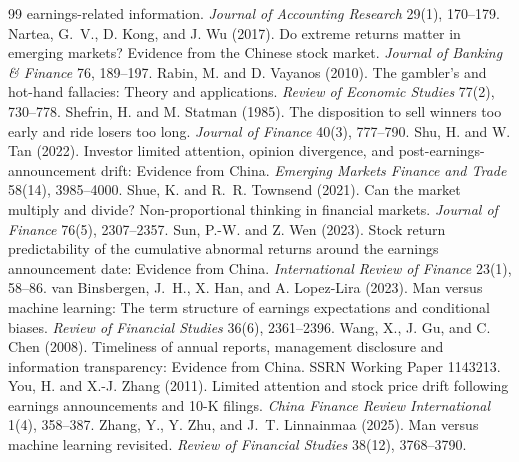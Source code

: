 \documentclass[10pt]{article}
\begin{document}
\begin{thebibliography}{99}
earnings-related information. \emph{Journal of Accounting Research} 29(1), 170--179.
 Nartea, G.~V., D. Kong, and J. Wu (2017). Do extreme returns matter in
emerging markets? Evidence from the Chinese stock market. \emph{Journal of Banking \& Finance} 76, 189--197.
 Rabin, M. and D. Vayanos (2010). The gambler's and hot-hand fallacies:
Theory and applications. \emph{Review of Economic Studies} 77(2), 730--778.
 Shefrin, H. and M. Statman (1985). The disposition to sell winners too
early and ride losers too long. \emph{Journal of Finance} 40(3), 777--790.
 Shu, H. and W. Tan (2022). Investor limited attention, opinion divergence, and
post-earnings-announcement drift: Evidence from China. \emph{Emerging Markets Finance and Trade} 58(14), 3985--4000.
 Shue, K. and R.~R. Townsend (2021). Can the market multiply and divide?
Non-proportional thinking in financial markets. \emph{Journal of Finance} 76(5), 2307--2357.
 Sun, P.-W. and Z. Wen (2023). Stock return predictability of the cumulative
abnormal returns around the earnings announcement date: Evidence from China. \emph{International Review of
Finance} 23(1), 58--86.
 van Binsbergen, J.~H., X. Han, and A. Lopez-Lira (2023). Man
versus machine learning: The term structure of earnings expectations and conditional biases. \emph{Review of
Financial Studies} 36(6), 2361--2396.
 Wang, X., J. Gu, and C. Chen (2008). Timeliness of annual reports, management
disclosure and information transparency: Evidence from China. SSRN Working Paper 1143213.
 You, H. and X.-J. Zhang (2011). Limited attention and stock price drift
following earnings announcements and 10-K filings. \emph{China Finance Review International} 1(4), 358--387.
 Zhang, Y., Y. Zhu, and J.~T. Linnainmaa (2025). Man versus machine learning
revisited. \emph{Review of Financial Studies} 38(12), 3768--3790.
\end{thebibliography}
\end{document}
